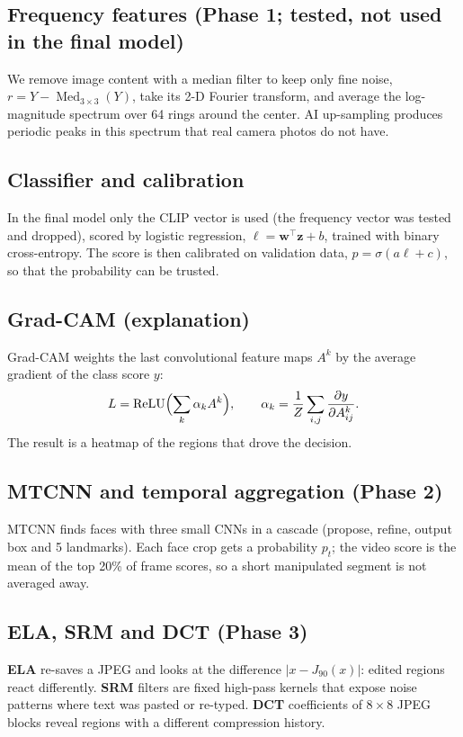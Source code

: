 \documentclass[11pt,a4paper]{article}
\begin{document}
\subsection*{Frequency features (Phase 1; tested, not used in the final model)}
We remove image content with a median filter to keep only fine noise, $r=Y-\operatorname{Med}_{3\times3}(Y)$,
take its 2-D Fourier transform, and average the log-magnitude spectrum over 64 rings around the
center. AI up-sampling produces periodic peaks in this spectrum that real camera photos do not have.

\subsection*{Classifier and calibration}
In the final model only the CLIP vector is used (the frequency vector was tested and dropped), scored by logistic regression,
$\ell=\mathbf{w}^{\top}\mathbf{z}+b$, trained with binary cross-entropy. The score is then
calibrated on validation data, $p=\sigma(a\ell+c)$, so that the probability can be trusted.

\subsection*{Grad-CAM (explanation)}
Grad-CAM weights the last convolutional feature maps $A^k$ by the average gradient of the class score $y$:
\[
  L=\operatorname{ReLU}\Bigl(\sum_k\alpha_k A^k\Bigr),\qquad \alpha_k=\frac{1}{Z}\sum_{i,j}\frac{\partial y}{\partial A^k_{ij}} .
\]
The result is a heatmap of the regions that drove the decision.

\subsection*{MTCNN and temporal aggregation (Phase 2)}
MTCNN finds faces with three small CNNs in a cascade (propose, refine, output box and 5 landmarks).
Each face crop gets a probability $p_t$; the video score is the mean of the top 20\% of frame scores,
so a short manipulated segment is not averaged away.

\subsection*{ELA, SRM and DCT (Phase 3)}
\textbf{ELA} re-saves a JPEG and looks at the difference $\lvert x-J_{90}(x)\rvert$: edited regions react
differently. \textbf{SRM} filters are fixed high-pass kernels that expose noise patterns where text was
pasted or re-typed. \textbf{DCT} coefficients of $8{\times}8$ JPEG blocks reveal regions with a different
compression history.
\end{document}
